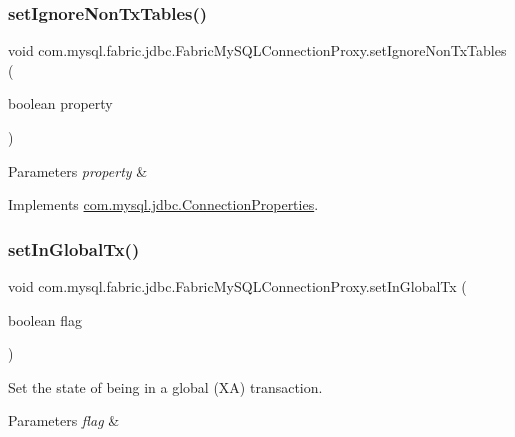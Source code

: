 \subsubsection{\texorpdfstring{set\+Ignore\+Non\+Tx\+Tables()}{setIgnoreNonTxTables()}}
{\footnotesize\ttfamily void com.\+mysql.\+fabric.\+jdbc.\+Fabric\+My\+S\+Q\+L\+Connection\+Proxy.\+set\+Ignore\+Non\+Tx\+Tables (\begin{DoxyParamCaption}\item[{boolean}]{property }\end{DoxyParamCaption})}


\begin{DoxyParams}{Parameters}
{\em property} & \\
\hline
\end{DoxyParams}


Implements \mbox{\hyperlink{interfacecom_1_1mysql_1_1jdbc_1_1_connection_properties_aef7c4c2447c9875392d6dff3452d9ac2}{com.\+mysql.\+jdbc.\+Connection\+Properties}}.

\mbox{\label{classcom_1_1mysql_1_1fabric_1_1jdbc_1_1_fabric_my_s_q_l_connection_proxy_ab784967ebf6d77d7f0c8dbdaac2597d9}} 
\subsubsection{\texorpdfstring{set\+In\+Global\+Tx()}{setInGlobalTx()}}
{\footnotesize\ttfamily void com.\+mysql.\+fabric.\+jdbc.\+Fabric\+My\+S\+Q\+L\+Connection\+Proxy.\+set\+In\+Global\+Tx (\begin{DoxyParamCaption}\item[{boolean}]{flag }\end{DoxyParamCaption})}

Set the state of being in a global (XA) transaction.


\begin{DoxyParams}{Parameters}
{\em flag} & \\
\hline
\end{DoxyParams}


